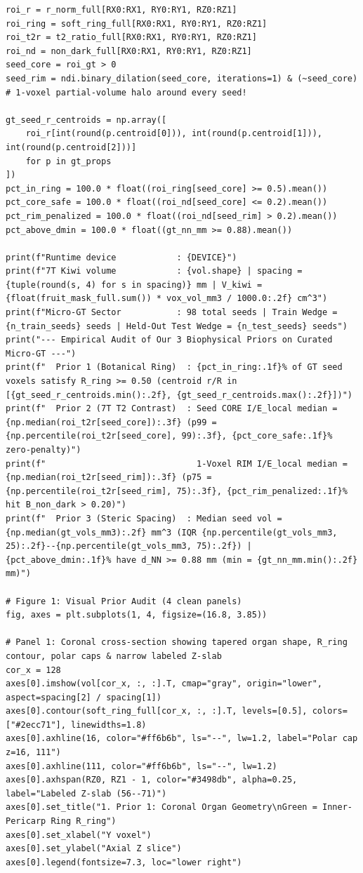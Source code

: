 \documentclass[10pt,a4paper]{article}
\begin{document}
\begin{codebox}
\begin{lstlisting}[style=pybmed]
roi_r = r_norm_full[RX0:RX1, RY0:RY1, RZ0:RZ1]
roi_ring = soft_ring_full[RX0:RX1, RY0:RY1, RZ0:RZ1]
roi_t2r = t2_ratio_full[RX0:RX1, RY0:RY1, RZ0:RZ1]
roi_nd = non_dark_full[RX0:RX1, RY0:RY1, RZ0:RZ1]
seed_core = roi_gt > 0
seed_rim = ndi.binary_dilation(seed_core, iterations=1) & (~seed_core)  # 1-voxel partial-volume halo around every seed!

gt_seed_r_centroids = np.array([
    roi_r[int(round(p.centroid[0])), int(round(p.centroid[1])), int(round(p.centroid[2]))]
    for p in gt_props
])
pct_in_ring = 100.0 * float((roi_ring[seed_core] >= 0.5).mean())
pct_core_safe = 100.0 * float((roi_nd[seed_core] <= 0.2).mean())
pct_rim_penalized = 100.0 * float((roi_nd[seed_rim] > 0.2).mean())
pct_above_dmin = 100.0 * float((gt_nn_mm >= 0.88).mean())

print(f"Runtime device            : {DEVICE}")
print(f"7T Kiwi volume            : {vol.shape} | spacing = {tuple(round(s, 4) for s in spacing)} mm | V_kiwi = {float(fruit_mask_full.sum()) * vox_vol_mm3 / 1000.0:.2f} cm^3")
print(f"Micro-GT Sector           : 98 total seeds | Train Wedge = {n_train_seeds} seeds | Held-Out Test Wedge = {n_test_seeds} seeds")
print("--- Empirical Audit of Our 3 Biophysical Priors on Curated Micro-GT ---")
print(f"  Prior 1 (Botanical Ring)  : {pct_in_ring:.1f}% of GT seed voxels satisfy R_ring >= 0.50 (centroid r/R in [{gt_seed_r_centroids.min():.2f}, {gt_seed_r_centroids.max():.2f}])")
print(f"  Prior 2 (7T T2 Contrast)  : Seed CORE I/E_local median = {np.median(roi_t2r[seed_core]):.3f} (p99 = {np.percentile(roi_t2r[seed_core], 99):.3f}, {pct_core_safe:.1f}% zero-penalty)")
print(f"                              1-Voxel RIM I/E_local median = {np.median(roi_t2r[seed_rim]):.3f} (p75 = {np.percentile(roi_t2r[seed_rim], 75):.3f}, {pct_rim_penalized:.1f}% hit B_non_dark > 0.20)")
print(f"  Prior 3 (Steric Spacing)  : Median seed vol = {np.median(gt_vols_mm3):.2f} mm^3 (IQR {np.percentile(gt_vols_mm3, 25):.2f}--{np.percentile(gt_vols_mm3, 75):.2f}) | {pct_above_dmin:.1f}% have d_NN >= 0.88 mm (min = {gt_nn_mm.min():.2f} mm)")

# Figure 1: Visual Prior Audit (4 clean panels)
fig, axes = plt.subplots(1, 4, figsize=(16.8, 3.85))

# Panel 1: Coronal cross-section showing tapered organ shape, R_ring contour, polar caps & narrow labeled Z-slab
cor_x = 128
axes[0].imshow(vol[cor_x, :, :].T, cmap="gray", origin="lower", aspect=spacing[2] / spacing[1])
axes[0].contour(soft_ring_full[cor_x, :, :].T, levels=[0.5], colors=["#2ecc71"], linewidths=1.8)
axes[0].axhline(16, color="#ff6b6b", ls="--", lw=1.2, label="Polar cap z=16, 111")
axes[0].axhline(111, color="#ff6b6b", ls="--", lw=1.2)
axes[0].axhspan(RZ0, RZ1 - 1, color="#3498db", alpha=0.25, label="Labeled Z-slab (56--71)")
axes[0].set_title("1. Prior 1: Coronal Organ Geometry\nGreen = Inner-Pericarp Ring R_ring")
axes[0].set_xlabel("Y voxel")
axes[0].set_ylabel("Axial Z slice")
axes[0].legend(fontsize=7.3, loc="lower right")


\end{lstlisting}
\end{codebox}
\end{document}
